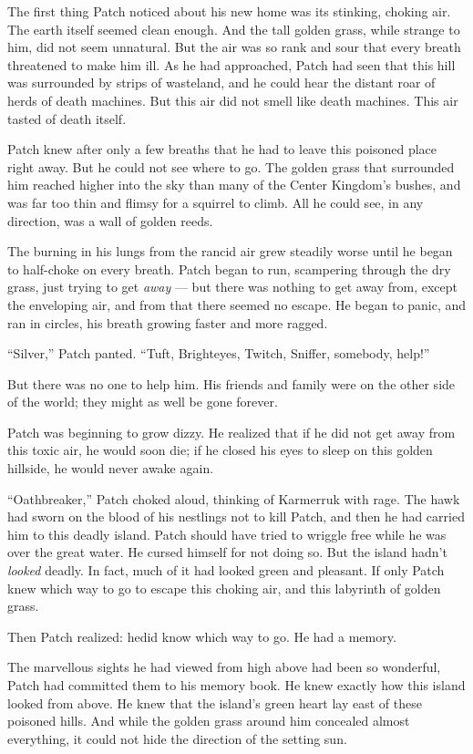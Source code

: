 \documentclass[12pt]{memoir}
\begin{document}
The first thing Patch noticed about his new home was its stinking,
choking air. The earth itself seemed clean enough. And the tall golden
grass, while strange to him, did not seem unnatural. But the air was
so rank and sour that every breath threatened to make him ill. As he
had approached, Patch had seen that this hill was surrounded by strips
of wasteland, and he could hear the distant roar of herds of death
machines. But this air did not smell like death machines. This air
tasted of death itself.

Patch knew after only a few breaths that he had to leave this poisoned
place right away. But he could not see where to go. The golden grass
that surrounded him reached higher into the sky than many of the
Center Kingdom’s bushes, and was far too thin and flimsy for a
squirrel to climb. All he could see, in any direction, was a wall of
golden reeds.

The burning in his lungs from the rancid air grew steadily worse until
he began to half-choke on every breath. Patch began to run, scampering
through the dry grass, just trying to get \textit{away} — but there
was nothing to get away from, except the enveloping air, and from that
there seemed no escape. He began to panic, and ran in circles, his
breath growing faster and more ragged.

“Silver,” Patch panted. “Tuft, Brighteyes, Twitch, Sniffer, somebody,
help!”

But there was no one to help him. His friends and family were on the
other side of the world; they might as well be gone forever.

Patch was beginning to grow dizzy. He realized that if he did not get
away from this toxic air, he would soon die; if he closed his eyes to
sleep on this golden hillside, he would never awake again.

“Oathbreaker,” Patch choked aloud, thinking of Karmerruk with
rage. The hawk had sworn on the blood of his nestlings not to kill
Patch, and then he had carried him to this deadly island. Patch should
have tried to wriggle free while he was over the great water. He
cursed himself for not doing so. But the island hadn’t \textit{looked}
deadly. In fact, much of it had looked green and pleasant. If only
Patch knew which way to go to escape this choking air, and this
labyrinth of golden grass.

Then Patch realized: he\textit{}did know which way to go. He had a
memory.

The marvellous sights he had viewed from high above had been so
wonderful, Patch had committed them to his memory book. He knew
exactly how this island looked from above. He knew that the island’s
green heart lay east of these poisoned hills. And while the golden
grass around him concealed almost everything, it could not hide the
direction of the setting sun.
\end{document}
